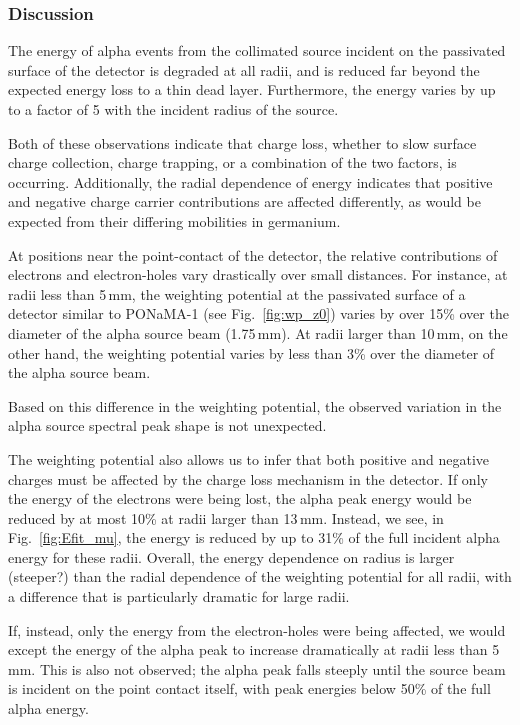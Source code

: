 \documentclass[groupedaddress,rmp,amsmath,amssymb,bibnotes,altaffilletter,twocolumn]{revtex4-1}
\begin{document}
\subsubsection{Discussion}
The energy of alpha events from the collimated source incident on the passivated surface of the detector is degraded at all radii, and is reduced far beyond the expected energy loss to a thin dead layer. Furthermore, the energy varies by up to a factor of 5 with the incident radius of the source. 

Both of these observations indicate that charge loss, whether to slow surface charge collection, charge trapping, or a combination of the two factors, is occurring. Additionally, the radial dependence of energy indicates that positive and negative charge carrier contributions are affected differently, as would be expected from their differing mobilities in germanium.

At positions near the point-contact of the detector, the relative contributions of electrons and electron-holes vary drastically over small distances. For instance, at radii less than 5\,mm, the weighting potential at the passivated surface of a detector similar to PONaMA-1 (see Fig.~\ref{fig:wp_z0}) varies by over 15\% over the diameter of the alpha source beam (1.75\,mm). At radii larger than 10\,mm, on the other hand, the weighting potential varies by less than 3\% over the diameter of the alpha source beam. 

Based on this difference in the weighting potential, the observed variation in the alpha source spectral peak shape is not unexpected. 

The weighting potential also allows us to infer that both positive and negative charges must be affected by the charge loss mechanism in the detector. If only the energy of the electrons were being lost, the alpha peak energy would be reduced by at most 10\% at radii larger than 13\,mm. Instead, we see, in Fig.~\ref{fig:Efit_mu}, the energy is reduced by up to 31\% of the full incident alpha energy for these radii. Overall, the energy dependence on radius is larger (steeper?) than the radial dependence of the weighting potential for all radii, with a difference that is particularly dramatic for large radii. 

If, instead, only the energy from the electron-holes were being affected, we would except the energy of the alpha peak to increase dramatically at radii less than 5\,mm. This is also not observed; the alpha peak falls steeply until the source beam is incident on the point contact itself, with peak energies below 50\% of the full alpha energy. 
\end{document}

